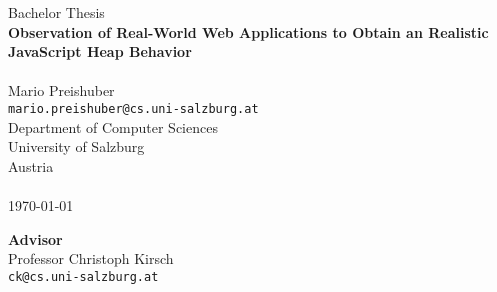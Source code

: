 \documentclass[10pt,fleqn, titlepage]{article}
\newcommand{\JS}{JavaScript\xspace}
\begin{document}
	
	
	\begin{titlepage}
		\centering

		\vspace*{\fill}
		{\LARGE 
		Bachelor Thesis									\\ \bigskip
		\textbf{Observation of Real-World Web Applications 
		to Obtain an Realistic \JS Heap Behavior}}		\\ \bigskip
		~ \\ \bigskip
		\Large Mario Preishuber 						\\ \smallskip
		\large
		\texttt{mario.preishuber@cs.uni-salzburg.at}	\\ \bigskip
		Department of Computer Sciences					\\ \smallskip			
		University of Salzburg							\\ \smallskip
		Austria											\\ \bigskip 
		~ \\ \bigskip
		\today
		\vspace*{\fill}
		
		\textbf{Advisor} 								\\ \bigskip
		Professor Christoph Kirsch						\\ \smallskip
		\texttt{ck@cs.uni-salzburg.at}					\\ \bigskip
	\end{titlepage}
	
	
	
	
	
	
	
	
	
	
	
	
	
	
	\appendix
	
	
	
	
\end{document}
